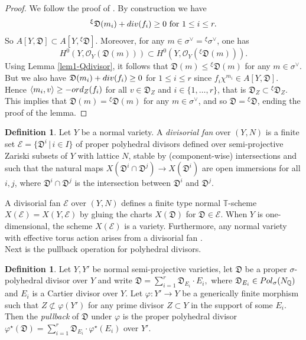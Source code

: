 \documentclass[11pt, reqno]{amsart}
\theoremstyle{plain}
\theoremstyle{definition}
\newtheorem{definition}[theorem]{Definition}
\theoremstyle{remark}
\begin{document}
\begin{proof}
We follow the proof of \cite[Th\'eor\`eme 2.4]{Lan13}. By construction
we have 
$${}^{\xi}\mathfrak{D}(m_{i}) + {\rm div}(f_{i})\geq 0 \text{ for } 1\leq i\leq r.$$
So $A[Y, \mathfrak{D}]\subset  A[Y, {}^{\xi}\mathfrak{D}]$. Moreover, for any $m\in \sigma^{\vee} = {}^{\xi}\sigma^{\vee}$, one has 
$$H^{0}(Y, \mathcal{O}_{Y}(\mathfrak{D}(m)))\subset H^{0}(Y, \mathcal{O}_{Y}({}^{\xi}\mathfrak{D}(m))).$$
Using Lemma \ref{lem1-Qdivisor}, it follows that $\mathfrak{D}(m)\leq {}^{\xi}\mathfrak{D}(m)$ for any $m\in \sigma^{\vee}$.
But we also have $\mathfrak{D}(m_{i})  + {\rm div}(f_{i})\geq 0$ for $1\leq i\leq r$  since $f_{i}\chi^{m_{i}}\in A[Y, \mathfrak{D}]$. Hence $\langle m_{i}, v\rangle \geq -{\rm ord}_{Z}(f_{i})$ for all $v\in \mathfrak{D}_{Z}$ and $i\in\{1, \ldots, r\}$, that is 
$\mathfrak{D}_{Z}\subset {}^{\xi}\mathfrak{D}_{Z}$. This implies that $\mathfrak{D}(m) =  {}^{\xi}\mathfrak{D}(m)$ for any $m\in \sigma^{\vee}$, and so $\mathfrak{D} =  {}^{\xi}\mathfrak{D}$, ending
the proof of the lemma. 
\end{proof}
\begin{definition}
Let $Y$ be a normal variety.
A \emph{divisorial fan} over $(Y, N)$ is a finite set $\mathscr{E} =  \{\mathfrak{D}^{i}\,|\, i\in I\}$
of proper polyhedral divisors defined over semi-projective Zariski subsets of $Y$ with lattice $N$, stable by (component-wise) intersections and such that
the natural maps 
$X(\mathfrak{D}^{i}\cap \mathfrak{D}^{j})\rightarrow X(\mathfrak{D}^{i})$
are open immersions for all $i, j$, where $\mathfrak{D}^{i}\cap \mathfrak{D}^{j}$ is the intersection between
$\mathfrak{D}^{i}$ and $\mathfrak{D}^{j}$. 
\end{definition}
 A divisorial fan $\mathscr{E}$ over $(Y, N)$ defines a finite type normal $\mathbb{T}$-scheme $X(\mathscr{E})  =  X(Y, \mathscr{E})$ by gluing the charts $X(\mathfrak{D})$ for $\mathfrak{D}\in \mathscr{E}$.
When $Y$ is one-dimensional, the scheme $X(\mathscr{E})$ is a variety. Furthermore, any normal variety with effective torus action arises from a divisorial fan \cite[Section 5]{AIPSV12}. 
\\

Next is the pullback operation for polyhedral divisors.
\begin{definition}\label{def-poulebaq}
Let $Y, Y'$ be normal semi-projective varieties, let $\mathfrak{D}$ be a proper $\sigma$-polyhedral divisor over $Y$ and write  $\mathfrak{D} =  \sum_{i = 1}^{r}\mathfrak{D}_{E_{i}}\cdot E_{i},$ where $\mathfrak{D}_{E_{i}}\in {\rm Pol}_{\sigma}(N_{\mathbb{Q}})$ and $E_{i}$ is a Cartier divisor over $Y$. Let $\varphi: Y'\rightarrow Y$ be a generically finite morphism such that $Z\not\subset\varphi(Y')$ for any prime divisor $Z\subset Y$ in the support of some $E_{i}$. Then the \emph{pullback} of $\mathfrak{D}$
under $\varphi$ is the proper polyhedral divisor $\varphi^{\star}(\mathfrak{D}) =  \sum_{i = 1}^{r}\mathfrak{D}_{E_{i}}\cdot \varphi^{\star}(E_{i})$ over $Y'$. 
\end{definition}
\end{document}
